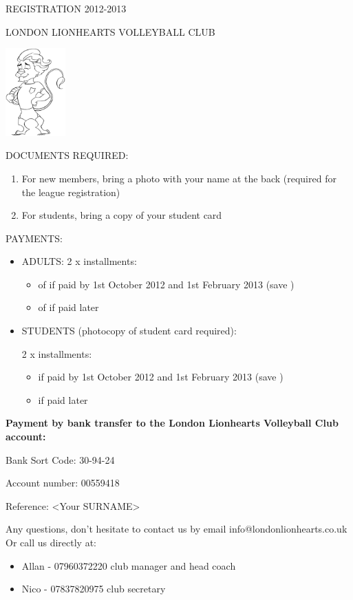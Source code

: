 \documentclass[a4paper,12pt]{article}
\begin{document}
\normalsize
\begin{center}
REGISTRATION 2012-2013

LONDON LIONHEARTS VOLLEYBALL CLUB
\vspace{0.5cm}

\includegraphics[width=2.3cm]{lions.png}
\end{center}

DOCUMENTS REQUIRED:
\begin{enumerate}
  \item For new members, bring a photo with your name at the back
(required for the league registration)
 \item For students, bring a copy of your student card
\end{enumerate}


PAYMENTS:
\begin{itemize}
\item ADULTS:
2 x installments:
\begin{itemize}
  \item of  if paid by 1st October 2012 and 1st February 2013 (save )
  \item of  if paid later
\end{itemize}

\item STUDENTS (photocopy of student card required):

2 x installments:
\begin{itemize}
  \item {} if paid by 1st October 2012 and 1st February 2013 (save )
  \item {} if paid later
\end{itemize}
\end{itemize}

{\bfseries Payment by bank transfer to the London Lionhearts Volleyball Club account:}

Bank Sort Code: 30-94-24

Account number: 00559418

Reference: <Your SURNAME>

Any questions, don't hesitate to contact us by email info@londonlionhearts.co.uk
Or call us directly at:

\begin{itemize}
  \item Allan - 07960372220	club manager and head coach
  \item Nico - 07837820975	club secretary
\end{itemize}
\newpage
\end{document}
